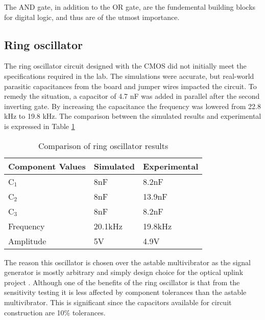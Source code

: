 The AND gate, in addition to the OR gate, are the fundemental building blocks for digital logic, and thus are of the utmost importance.


\subsection{Ring oscillator}
The ring oscillator circuit designed with the CMOS did not initially meet the specifications required in the lab. The simulations were accurate, but real-world parasitic capacitances from the board and jumper wires impacted the circuit. To remedy the situation, a capacitor of 4.7 nF was added in parallel after the second inverting gate. By increasing the capacitance the frequency was lowered from 22.8 kHz to 19.8 kHz. The comparison between the simulated results and experimental is expressed in Table \ref{tab:simvexpring}

\begin{table}[H]
	\centering
	\caption{Comparison of ring oscillator results}
	\label{tab:simvexpring}
	\begin{tabular}{|l|l|l|}
		\hline
		Component Values & Simulated & Experimental \\ \hline
		C$_1$            & 8nF       & 8.2nF        \\ \hline
		C$_2$            & 8nF       & 13.9nF       \\ \hline
		C$_3$            & 8nF       & 8.2nF        \\ \hline
		Frequency        & 20.1kHz   & 19.8kHz      \\ \hline
		Amplitude        & 5V        & 4.9V         \\ \hline
	\end{tabular}
	\end{table}
The reason this oscillator is chosen over the astable multivibrator as the signal generator is mostly arbitrary and simply design choice for the optical uplink project \cite{b4}. Although one of the benefits of the ring oscillator is that from the sensitivity testing it is less affected by component tolerances than the astable multivibrator. This is significant since the capacitors available for circuit construction are 10\% tolerances.



